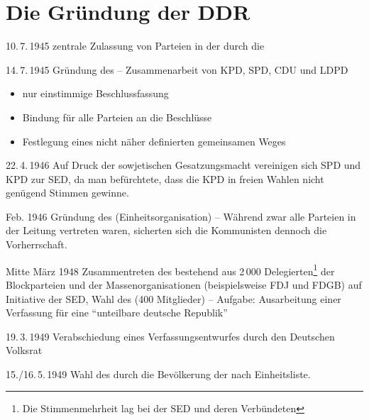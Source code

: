 \section[Gründung der DDR]{Die Gründung der DDR
}
\label{sec:gruend-ddr}

\begin{chronik}
\item[10.\,7.\,1945]
zentrale Zulassung von Parteien in der \textsf{} durch die

\item[14.\,7.\,1945]
Gründung des  --
Zusammenarbeit von KPD, SPD, CDU und LDPD
\begin{itemize}
\item nur einstimmige Beschlussfassung
\item Bindung für alle Parteien an die Beschlüsse
\item Festlegung eines nicht näher definierten gemeinsamen Weges
\end{itemize}

\item[22.\,4.\,1946]
Auf Druck der sowjetischen Gesatzungsmacht vereinigen sich SPD und KPD
zur SED, da man befürchtete, dass die KPD in
freien Wahlen nicht genügend Stimmen gewinne.

\item[Feb. 1946]
Gründung des \textsf{}
(Einheitsorganisation) -- Während zwar
alle Parteien in der Leitung vertreten waren, sicherten sich die
Kommunisten dennoch die Vorherrschaft.

\item[Mitte März 1948]
Zusammentreten des  bestehend aus 2\,000
Delegierten\footnote{Die Stimmenmehrheit lag bei der SED und deren
Verbündeten} der Blockparteien und der Massenorganisationen
(beispielsweise FDJ und FDGB) auf Initiative der SED, Wahl des
 (400 Mitglieder) --
Aufgabe: Ausarbeitung einer Verfassung für eine \enquote{unteilbare
deutsche Republik}

\item[19.\,3.\,1949]
Verabschiedung eines Verfassungsentwurfes durch den Deutschen Volksrat

\item[15./16.\,5.\,1949]
Wahl des  durch die Bevölkerung der  nach
Einheitsliste.


\end{chronik}
